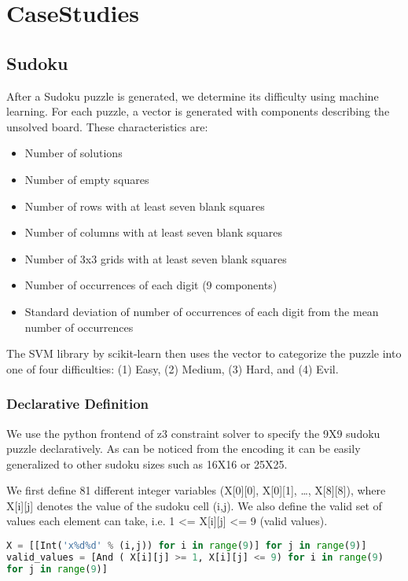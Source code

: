 \section{CaseStudies}

\subsection{Sudoku}


After a Sudoku puzzle is generated, we determine its difficulty using
machine learning. For each puzzle, a vector is generated with
components describing the unsolved board. These characteristics are:

\begin{itemize}
\item Number of solutions
\item Number of empty squares
\item Number of rows with at least seven blank squares
\item Number of columns with at least seven blank squares
\item Number of 3x3 grids with at least seven blank squares
\item Number of occurrences of each digit (9 components)
\item Standard deviation of number of occurrences of each digit from the mean number of occurrences
\end{itemize}


The SVM library by scikit-learn then uses the vector to categorize the
puzzle into one of four difficulties: (1) Easy, (2) Medium, (3) Hard,
and (4) Evil.

\subsubsection{Declarative Definition}
We use the python frontend of z3 constraint solver to specify the 9X9
sudoku puzzle declaratively. As can be noticed from the encoding it
can be easily generalized to other sudoku sizes such as 16X16 or
25X25.


We first define 81 different integer variables (X[0][0], X[0][1], …,
X[8][8]), where X[i][j] denotes the value of the sudoku cell (i,j). We
also define the valid set of values each element can take, i.e. 1 <=
X[i][j] <= 9 (valid values).

\begin{lstlisting}[language=python]
X = [[Int('x%d%d' % (i,j)) for i in range(9)] for j in range(9)]
valid_values = [And ( X[i][j] >= 1, X[i][j] <= 9) for i in range(9)
for j in range(9)]

\end{lstlisting}

